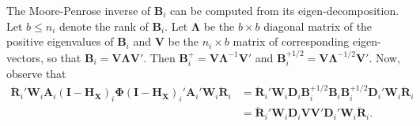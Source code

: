 \documentclass[12pt]{article}
\begin{document}
The Moore-Penrose inverse of \(\mathbf{B}_i\) can be computed from its
eigen-decomposition. Let \(b \leq n_i\) denote the rank of
\(\mathbf{B}_i\). Let \(\boldsymbol\Lambda\) be the \(b \times b\)
diagonal matrix of the positive eigenvalues of \(\mathbf{B}_i\) and
\(\mathbf{V}\) be the \(n_i \times b\) matrix of corresponding
eigen-vectors, so that
\(\mathbf{B}_i = \mathbf{V}\boldsymbol\Lambda\mathbf{V}'\). Then
\(\mathbf{B}_i^+ = \mathbf{V}\boldsymbol\Lambda^{-1}\mathbf{V}'\) and
\(\mathbf{B}_i^{+1/2} = \mathbf{V}\boldsymbol\Lambda^{-1/2}\mathbf{V}'\).
Now, observe that \begin{equation}\begin{aligned}
\label{eq:step1}
\mathbf{\ddot{R}}_i' \mathbf{W}_i \mathbf{A}_i \left(\mathbf{I} - \mathbf{H_X}\right)_i \boldsymbol\Phi \left(\mathbf{I} - \mathbf{H_X}\right)_i' \mathbf{A}_i' \mathbf{W}_i \mathbf{\ddot{R}}_i &= \mathbf{\ddot{R}}_i' \mathbf{W}_i \mathbf{D}_i \mathbf{B}_i^{+1/2} \mathbf{B}_i \mathbf{B}_i^{+1/2} \mathbf{D}_i' \mathbf{W}_i \mathbf{\ddot{R}}_i \\
&= \mathbf{\ddot{R}}_i' \mathbf{W}_i \mathbf{D}_i \mathbf{V}\mathbf{V}' \mathbf{D}_i' \mathbf{W}_i \mathbf{\ddot{R}}_i. 
\end{aligned}\end{equation}
\end{document}
